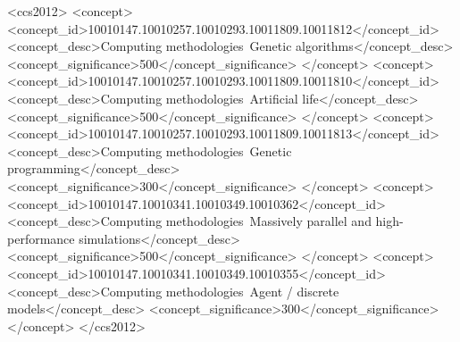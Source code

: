 \begin{CCSXML}
    <ccs2012>
       <concept>
           <concept_id>10010147.10010257.10010293.10011809.10011812</concept_id>
           <concept_desc>Computing methodologies~Genetic algorithms</concept_desc>
           <concept_significance>500</concept_significance>
           </concept>
       <concept>
           <concept_id>10010147.10010257.10010293.10011809.10011810</concept_id>
           <concept_desc>Computing methodologies~Artificial life</concept_desc>
           <concept_significance>500</concept_significance>
           </concept>
       <concept>
           <concept_id>10010147.10010257.10010293.10011809.10011813</concept_id>
           <concept_desc>Computing methodologies~Genetic programming</concept_desc>
           <concept_significance>300</concept_significance>
           </concept>
       <concept>
           <concept_id>10010147.10010341.10010349.10010362</concept_id>
           <concept_desc>Computing methodologies~Massively parallel and high-performance simulations</concept_desc>
           <concept_significance>500</concept_significance>
           </concept>
       <concept>
           <concept_id>10010147.10010341.10010349.10010355</concept_id>
           <concept_desc>Computing methodologies~Agent / discrete models</concept_desc>
           <concept_significance>300</concept_significance>
           </concept>
     </ccs2012>
\end{CCSXML}



\maketitle
